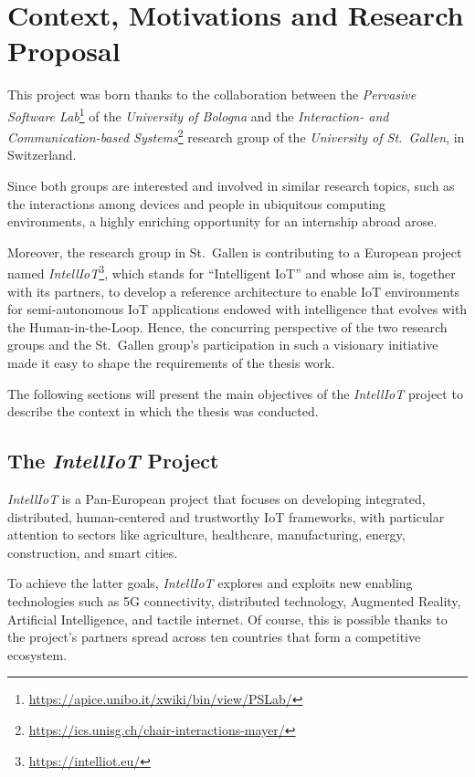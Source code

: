 \chapter{Context, Motivations and Research Proposal}\label{context}
This project was born thanks to the collaboration between the \textit{Pervasive Software Lab}\footnote{\href{https://apice.unibo.it/xwiki/bin/view/PSLab/}{https://apice.unibo.it/xwiki/bin/view/PSLab/}} of the \textit{University of Bologna} and the \textit{Interaction- and Communication-based Systems}\footnote{\href{https://ics.unisg.ch/chair-interactions-mayer/}{https://ics.unisg.ch/chair-interactions-mayer/}} research group of the \textit{University of St.\ Gallen}, in Switzerland.

Since both groups are interested and involved in similar research topics, such as the interactions among devices and people in ubiquitous computing environments, a highly enriching opportunity for an internship abroad arose.

Moreover, the research group in St.\ Gallen is contributing to a European project named \textit{IntellIoT}\footnote{\href{https://intelliot.eu/}{https://intelliot.eu/}}, which stands for ``Intelligent IoT'' and whose aim is, together with its partners, to develop a reference architecture to enable IoT environments for semi-autonomous IoT applications endowed with intelligence that evolves with the Human-in-the-Loop.
Hence, the concurring perspective of the two research groups and the St.\ Gallen group's participation in such a visionary initiative made it easy to shape the requirements of the thesis work.

The following sections will present the main objectives of the \textit{IntellIoT} project to describe the context in which the thesis was conducted.

\newpage

\section{The \textit{IntellIoT} Project}\label{intelliot-project}
\textit{IntellIoT} is a Pan-European project that focuses on developing integrated, distributed, human-centered and trustworthy IoT frameworks, with particular attention to sectors like agriculture, healthcare, manufacturing, energy, construction, and smart cities.

To achieve the latter goals, \textit{IntellIoT} explores and exploits new enabling technologies such as 5G connectivity, distributed technology, Augmented Reality, Artificial Intelligence, and tactile internet.
Of course, this is possible thanks to the project's partners spread across ten countries that form a competitive ecosystem.

